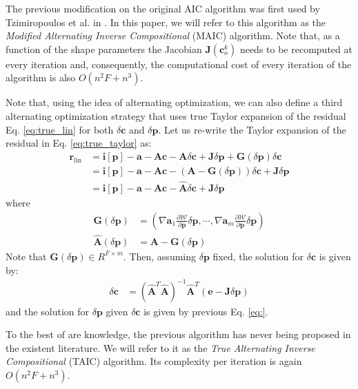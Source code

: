 The previous modification on the original AIC algorithm was first used by Tzimiropoulos et al. in \cite{Tzimiropoulos2012}. In this paper, we will refer to this algorithm as the \emph{Modified Alternating Inverse Compositional} (MAIC) algorithm. Note that, as a function of the shape parameters the Jacobian $\mathbf{J}(\mathbf{c}_o^k)$ needs to be recomputed at every iteration and, consequently, the computational cost of every iteration of the algorithm is also $O(n^2F + n^3)$. 

Note that, using the idea of alternating optimization, we can also define a third alternating optimization strategy that uses true Taylor expansion of the residual Eq. \ref{eq:true_lin} for both $\delta{\mathbf{c}}$ and $\delta{\mathbf{p}}$. Let us re-write the Taylor expansion of the residual in Eq. \ref{eq:true_taylor} as:
\begin{equation}
    \begin{aligned}
        \mathbf{r}_\text{lin} & = \mathbf{i}[\mathbf{p}] - \mathbf{a} - \mathbf{A}\mathbf{c} - \mathbf{A}\delta\mathbf{c} + \mathbf{J}\delta\mathbf{p} + \mathbf{G}(\delta\mathbf{p}) \delta\mathbf{c}
        \\
        & = \mathbf{i}[\mathbf{p}] - \mathbf{a} - \mathbf{A}\mathbf{c} - \left( \mathbf{A} - \mathbf{G}(\delta\mathbf{p}) \right) \delta\mathbf{c} + \mathbf{J}\delta\mathbf{p}
        \\
        & = \mathbf{i}[\mathbf{p}] - \mathbf{a} - \mathbf{A}\mathbf{c} - \hat{\mathbf{A}} \delta\mathbf{c} + \mathbf{J}\delta\mathbf{p}
        \label{eq:alt_solution_appearance}
    \end{aligned}
\end{equation}
where
\begin{equation}
    \begin{aligned}
        \mathbf{G}(\delta\mathbf{p}) & = \left( \nabla \mathbf{a}_1 \frac{\partial\mathcal{W}}{\partial\mathbf{p}}\delta\mathbf{p}, \cdots, \nabla \mathbf{a}_m \frac{\partial\mathcal{W}}{\partial\mathbf{p}}\delta\mathbf{p} \right)
        \\
        \hat{\mathbf{A}}(\delta\mathbf{p}) & = \mathbf{A} - \mathbf{G}(\delta \mathbf{p})
        \label{eq:alt_solution_appearance}
    \end{aligned}
\end{equation}
Note that $\mathbf{G}(\delta\mathbf{p}) \in R^{F \times m}$. Then, assuming $\delta{\mathbf{p}}$ fixed, the solution for $\delta\mathbf{c}$ is given by:
\begin{equation}
    \begin{aligned}
        \delta\mathbf{c} & = \left( \hat{\mathbf{A}}^T\hat{\mathbf{A}} \right)^{-1} \hat{\mathbf{A}} ^T (\mathbf{e} - \mathbf{J}\delta\mathbf{p})
        \label{eq:alt_solution_appearance}
\end{aligned}
\end{equation}
and the solution for $\delta \mathbf{p}$ given $\delta\mathbf{c}$ is given by previous Eq. \ref{eq:}.

To the best of are knowledge, the previous algorithm has never being proposed in the existent literature. We will refer to it as the \emph{True Alternating Inverse Compositional} (TAIC) algorithm. Its complexity per iteration is again $O(n^2F + n^3)$.